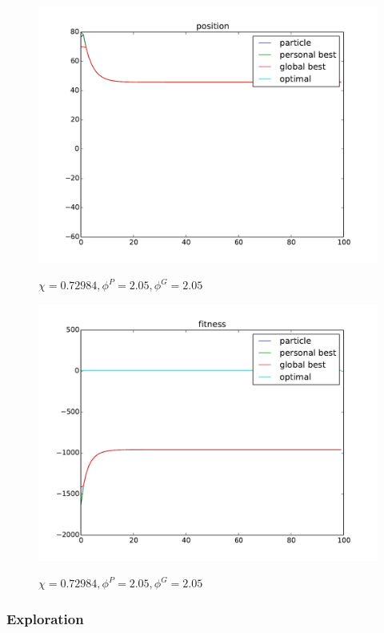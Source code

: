 \begin{figure}[ht]
\centering
\includegraphics[width=.7\linewidth]{./simfig/case2/position2-2} 
\label{fig:case2-2:position}
\caption{$ \chi = 0.72984 , \phi^{P} = 2.05 , \phi^{G} = 2.05 $ }
\end{figure}
  
\begin{figure}[ht]
\centering
\includegraphics[width=.7\linewidth]{./simfig/case2/fitness2-2} 
\label{fig:case2-2:fitness} 
\caption{$ \chi = 0.72984 , \phi^{P} = 2.05 , \phi^{G} = 2.05 $ }
\end{figure}

\subsubsection{Exploration}
